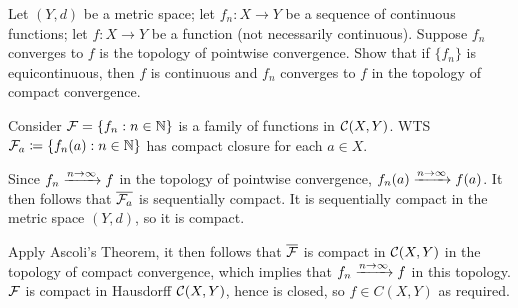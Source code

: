 \documentclass[a4paper, 10pt]{article}
\begin{document}
\begin{problem} [47.5]
    Let $(Y, d)$ be a metric space; let $f_n: X \to Y$ be a sequence of continuous functions; let $f: X \to Y$ be a function (not necessarily continuous). Suppose $f_n$ converges to $f$ is the topology of pointwise convergence. Show that if $\{f_n\}$ is equicontinuous, then $f$ is continuous and $f_n$ converges to $f$ in the topology of compact convergence.
\end{problem}
\begin{solution}
    Consider $\mathcal{F} = \{f_n : n \in \mathbb{N}\}$ is a family of functions in $\mathcal{C}(X, Y)$. WTS $\mathcal{F}_a \coloneqq \{f_n(a) : n \in \mathbb{N}\}$ has compact closure for each $a \in X$.

    Since $f_n \xrightarrow{n \to \infty} f$ in the topology of pointwise convergence, $f_n(a) \xrightarrow{n \to \infty} f(a)$. It then follows that $\overline{\mathcal{F}_a}$ is sequentially compact. It is sequentially compact in the metric space $(Y, d)$, so it is compact.

    Apply Ascoli's Theorem, it then follows that $\overline{\mathcal{F}}$ is compact in $\mathcal{C}(X, Y)$ in the topology of compact convergence, which implies that $f_n \xrightarrow{n \to \infty} f$ in this topology. $\mathcal{F}$ is compact in Hausdorff $\mathcal{C}(X, Y)$, hence is closed, so $f \in C(X, Y)$ as required.
\end{solution}
\end{document}
